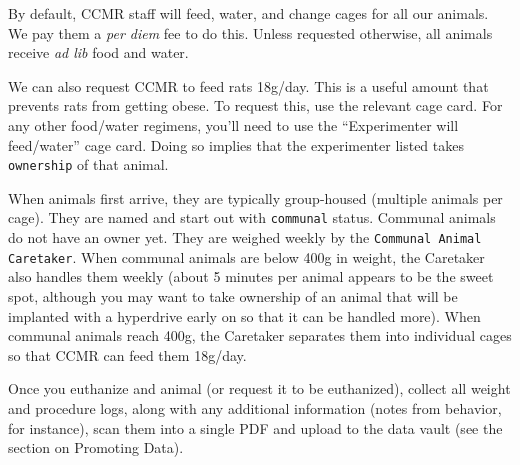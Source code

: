 \documentclass{tufte-book}
\newcommand{\doccls}[1]{\texttt{#1}}%
\begin{document}
By default, CCMR staff will feed, water, and change cages for all our
animals. We pay them a {\it per diem} fee to do this. Unless requested
otherwise, all animals receive {\it ad lib} food and water.

We can also request CCMR to feed rats 18g/day. This is a useful amount
that prevents rats from getting obese. To request this, use the
relevant cage card. For any other food/water
regimens, you'll need to use the ``Experimenter will feed/water'' cage
card. Doing so implies that the experimenter listed takes
\doccls{ownership} of that animal.

When animals first arrive, they are typically group-housed (multiple
animals per cage). They are named and start out with \doccls{communal}
status. Communal animals do not have an owner yet. They are weighed
weekly by the \doccls{Communal Animal Caretaker}. When communal animals are below 400g
in weight, the Caretaker also handles them weekly (about 5 minutes per
animal appears to be the sweet spot, although you may want to take
ownership of an animal that will be implanted with a hyperdrive early
on so that it can be handled more). When communal animals reach 400g,
the Caretaker separates them into individual cages so that CCMR can
feed them 18g/day.

Once you euthanize and animal (or request it to be euthanized),
collect all weight and procedure logs, along with any additional
information (notes from behavior, for instance), scan them into a
single PDF and
upload to the data vault (see the section on Promoting Data).
\end{document}
